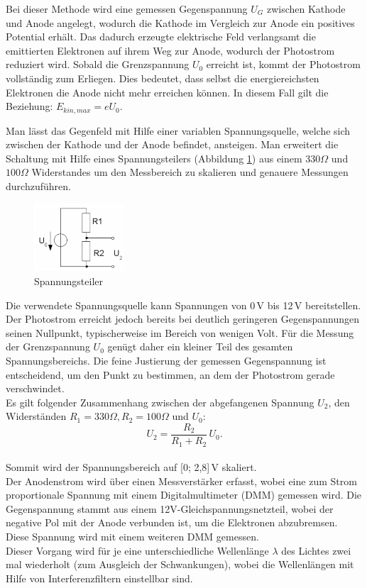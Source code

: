 Bei dieser Methode wird eine gemessen Gegenspannung $U_G$ zwischen Kathode und Anode angelegt, wodurch die Kathode im Vergleich zur Anode ein positives Potential erhält.
Das dadurch erzeugte elektrische Feld verlangsamt die emittierten Elektronen auf ihrem Weg zur Anode, wodurch der Photostrom reduziert wird. Sobald die Grenzspannung $U_0$ erreicht ist, kommt der Photostrom vollständig zum Erliegen. 
Dies bedeutet, dass selbst die energiereichsten Elektronen die Anode nicht mehr erreichen können. In diesem Fall gilt die Beziehung: 
$E_{kin,max} = eU_0$.

Man lässt das Gegenfeld mit Hilfe einer variablen Spannungsquelle, welche sich zwischen der Kathode und der Anode befindet, ansteigen.
Man erweitert die Schaltung mit Hilfe eines Spannungsteilers (Abbildung \ref{fig:spannungsteiler}) aus einem $330\Omega$ und $100\Omega$ Widerstandes um den Messbereich zu skalieren und genauere Messungen durchzuführen.
\begin{figure}[htbp]
    \centering
    \includegraphics[width=0.3\textwidth]{figs/Spannungsteiler.png}
    \caption{ Spannungsteiler \cite{Spannungsteiler}}
    \label{fig:spannungsteiler}
\end{figure}
\FloatBarrier
Die verwendete Spannungsquelle kann Spannungen von 0\,V bis 12\,V bereitstellen. 
Der Photostrom erreicht jedoch bereits bei deutlich geringeren Gegenspannungen seinen Nullpunkt, typischerweise im Bereich von wenigen Volt. 
Für die Messung der Grenzspannung $U_0$ genügt daher ein kleiner Teil des gesamten Spannungsbereichs. 
Die feine Justierung der gemessen Gegenspannung ist entscheidend, um den Punkt zu bestimmen, an dem der Photostrom gerade verschwindet.\\
Es gilt folgender Zusammenhang zwischen der abgefangenen Spannung $U_2$, den Widerständen $R_1 = 330 \Omega, R_2 = 100 \Omega$ und $U_0$:
\begin{equation}
  U_2 = \frac{R_2}{R_1 + R_2}\,U_0.
\end{equation}\\
Sommit wird der Spannungsbereich auf [0; 2{,}8]\,V skaliert.\\

Der Anodenstrom wird über einen Messverstärker erfasst, 
wobei eine zum Strom proportionale Spannung mit einem 
Digitalmultimeter (DMM) gemessen wird. Die Gegenspannung 
stammt aus einem 12V-Gleichspannungsnetzteil, 
wobei der negative Pol mit der Anode verbunden ist, 
um die Elektronen abzubremsen. Diese Spannung wird 
mit einem weiteren DMM gemessen.\\
Dieser Vorgang wird für je eine unterschiedliche Wellenlänge
$\lambda$ des Lichtes zwei mal wiederholt (zum Ausgleich der Schwankungen), wobei die
Wellenlängen mit Hilfe von Interferenzfiltern
einstellbar sind.

